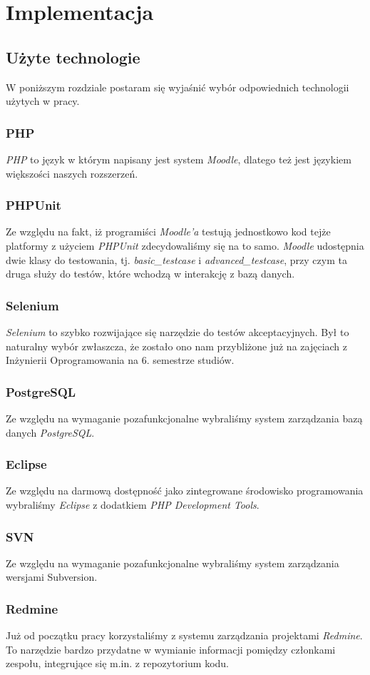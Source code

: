 \documentclass[12pt]{article}
\begin{document}
\section{Implementacja}
\subsection{Użyte technologie}
W poniższym rozdziale postaram się wyjaśnić wybór odpowiednich technologii użytych w pracy.
\subsubsection{PHP}
\emph{PHP} to język w którym napisany jest system \emph{Moodle}, dlatego też jest językiem większości naszych rozszerzeń.
\subsubsection{PHPUnit}
Ze względu na fakt, iż programiści \emph{Moodle'a} testują jednostkowo kod tejże platformy z użyciem \emph{PHPUnit} zdecydowaliśmy się na to samo. \emph{Moodle} udostępnia dwie klasy do testowania, tj. \emph{basic\_testcase} i \emph{advanced\_testcase}, przy czym ta druga służy do testów, które wchodzą w interakcję z bazą danych.
\subsubsection{Selenium}
\emph{Selenium} to szybko rozwijające się narzędzie do testów akceptacyjnych. Był to naturalny wybór zwłaszcza, że zostało ono nam przybliżone już na zajęciach z Inżynierii Oprogramowania na 6. semestrze studiów.
\subsubsection{PostgreSQL}
Ze względu na wymaganie pozafunkcjonalne wybraliśmy system zarządzania bazą danych \emph{PostgreSQL}.
\subsubsection{Eclipse}
Ze względu na darmową dostępność jako zintegrowane środowisko programowania wybraliśmy \emph{Eclipse} z dodatkiem \emph{PHP Development Tools}.
\subsubsection{SVN}
Ze względu na wymaganie pozafunkcjonalne wybraliśmy system zarządzania wersjami Subversion.
\subsubsection{Redmine}
Już od początku pracy korzystaliśmy z systemu zarządzania projektami \emph{Redmine}. To narzędzie bardzo przydatne w wymianie informacji pomiędzy członkami zespołu, integrujące się m.in. z repozytorium kodu.
\end{document}

